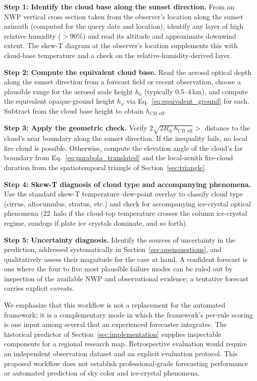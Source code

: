 \documentclass[11pt,a4paper]{article}
\begin{document}
\textbf{Step 1: Identify the cloud base along the sunset direction.} From an NWP vertical cross section taken from the observer's location along the sunset azimuth (computed for the query date and location), identify any layer of high relative humidity ($> 90\%$) and read its altitude and approximate downwind extent. The skew-T diagram at the observer's location supplements this with cloud-base temperature and a check on the relative-humidity-derived layer.

\textbf{Step 2: Compute the equivalent cloud base.} Read the aerosol optical depth along the sunset direction from a forecast field or recent observation, choose a plausible range for the aerosol scale height $h_a$ (typically 0.5--4\,km), and compute the equivalent opaque-ground height $h_x$ via Eq.~\ref{eq:equivalent_ground} for each. Subtract from the cloud base height to obtain $h_{CB, \text{eff}}$.

\textbf{Step 3: Apply the geometric check.} Verify $2\sqrt{2 R_\oplus \, h_{CB, \text{eff}}} > $ distance to the cloud's near boundary along the sunset direction. If the inequality fails, no local fire cloud is possible. Otherwise, compute the elevation angle of the cloud's far boundary from Eq.~\ref{eq:parabola_translated} and the local-zenith fire-cloud duration from the spatiotemporal triangle of Section~\ref{sec:triangle}.

\textbf{Step 4: Skew-T diagnosis of cloud type and accompanying phenomena.} Use the standard skew-T temperature--dew-point overlay to classify cloud type (cirrus, altocumulus, stratus, etc.) and check for accompanying ice-crystal optical phenomena (22\textdegree\ halo if the cloud-top temperature crosses the column ice-crystal regime, sundogs if plate ice crystals dominate, and so forth).

\textbf{Step 5: Uncertainty diagnosis.} Identify the sources of uncertainty in the prediction, addressed systematically in Section~\ref{sec:openquestions}, and qualitatively assess their magnitude for the case at hand. A confident forecast is one where the four to five most plausible failure modes can be ruled out by inspection of the available NWP and observational evidence; a tentative forecast carries explicit caveats.

We emphasize that this workflow is not a replacement for the automated framework; it is a complementary mode in which the framework's per-rule scoring is one input among several that an experienced forecaster integrates. The historical predictor of Section~\ref{sec:implementation} supplies inspectable components for a regional research map. Retrospective evaluation would require an independent observation dataset and an explicit evaluation protocol. This proposed workflow does not establish professional-grade forecasting performance or automated prediction of sky color and ice-crystal phenomena.
\end{document}
